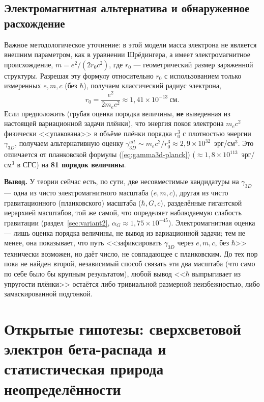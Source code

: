 \documentclass[12pt,a4paper]{article}
\begin{document}
\subsection{Электромагнитная альтернатива и обнаруженное расхождение}

Важное методологическое уточнение: в этой модели масса электрона не
является внешним параметром, как в уравнении Шрёдингера, а имеет
электромагнитное происхождение, $m=e^2/(2r_0c^2)$, где $r_0$ ---
геометрический размер заряженной структуры. Разрешая эту формулу
относительно $r_0$ с использованием только измеренных $e,m,c$ (без
$\hbar$), получаем классический радиус электрона,
\begin{equation}
r_0=\frac{e^2}{2m_ec^2}\approx1{,}41\times10^{-13}\ \text{см}.
\end{equation}
Если предположить (грубая оценка порядка величины, \textbf{не} выведенная
из настоящей вариационной задачи плёнки), что энергия покоя электрона
$m_ec^2$ физически <<упакована>> в объёме плёнки порядка $r_0^3$ с
плотностью энергии $\gamma_{3D}$, получаем альтернативную оценку
$\gamma_{3D}^{alt}\sim m_ec^2/r_0^3\approx2{,}9\times10^{32}$~эрг/см$^3$.
Это отличается от планковской формулы (\ref{eq:gamma3d-planck})
($\approx1{,}8\times10^{113}$~эрг/см$^3$ в СГС) на \textbf{81 порядок
величины}.

\textbf{Вывод.} У теории сейчас есть, по сути, две несовместимые
кандидатуры на $\gamma_{3D}$ --- одна из чисто электромагнитного масштаба
($e,m,c$), другая из чисто гравитационного (планковского) масштаба
($\hbar,G,c$), разделённые гигантской иерархией масштабов, той же самой,
что определяет наблюдаемую слабость гравитации (раздел~\ref{sec:variant2},
$\alpha_G\approx1{,}75\times10^{-45}$). Электромагнитная оценка --- лишь
оценка порядка величины, не вывод из вариационной задачи; тем не менее,
она показывает, что путь <<зафиксировать $\gamma_{3D}$ через $e,m,c$, без
$\hbar$>> технически возможен, но даёт число, не совпадающее с планковским.
До тех пор пока не найден второй, независимый способ связать эти два
масштаба (что само по себе было бы крупным результатом), любой вывод
<<$\hbar$ выпрыгивает из упругости плёнки>> остаётся либо тривиальной
размерной неизбежностью, либо замаскированной подгонкой.

\section{Открытые гипотезы: сверхсветовой электрон бета-распада и статистическая природа неопределённости}
\label{sec:open-hypotheses}
\end{document}
